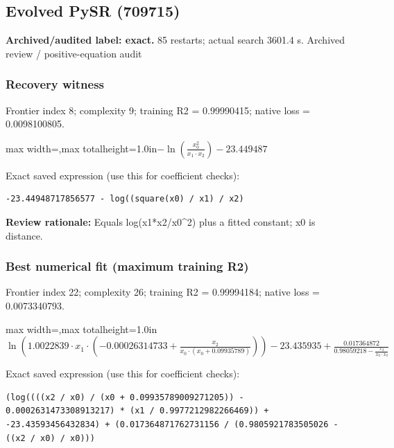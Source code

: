 \documentclass[10pt,letterpaper,landscape]{article}
\begin{document}
\begin{minipage}[t]{0.485\textwidth}
\subsection*{Evolved PySR (709715)}
\textbf{Archived/audited label: exact.} 85 restarts; actual search 3601.4 s.
{\small Archived review / positive-equation audit}
\subsubsection*{Recovery witness}
Frontier index 8; complexity 9; training R2 = 0.99990415; native loss = 0.0098100805.
\begin{center}\begin{adjustbox}{max width=\linewidth,max totalheight=1.0in}$\displaystyle - \ln{\left(\frac{x_{0}^{2}}{x_{1} \cdot x_{2}} \right)} - 23.449487$\end{adjustbox}\end{center}
{\scriptsize Exact saved expression (use this for coefficient checks):}
\begin{lstlisting}
-23.44948717856577 - log((square(x0) / x1) / x2)
\end{lstlisting}
{\small\textbf{Review rationale:} Equals log(x1*x2/x0\textasciicircum{}2) plus a fitted constant; x0 is distance.}
\subsubsection*{Best numerical fit (maximum training R2)}
Frontier index 22; complexity 26; training R2 = 0.99994184; native loss = 0.0073340793.
\begin{center}\begin{adjustbox}{max width=\linewidth,max totalheight=1.0in}$\displaystyle \ln{\left(1.0022839 \cdot x_{1} \cdot \left(-0.00026314733 + \frac{x_{2}}{x_{0} \cdot \left(x_{0} + 0.09935789\right)}\right) \right)} - 23.435935 + \frac{0.017364872}{0.98059218 - \frac{x_{2}}{x_{0} \cdot x_{0}}}$\end{adjustbox}\end{center}
{\scriptsize Exact saved expression (use this for coefficient checks):}
\begin{lstlisting}
(log((((x2 / x0) / (x0 + 0.09935789009271205)) - 0.0002631473308913217) * (x1 / 0.9977212982266469)) + -23.43593456432834) + (0.017364871762731156 / (0.9805921783505026 - ((x2 / x0) / x0)))
\end{lstlisting}
\end{minipage}
\clearpage{}\label{planck-10000}
\end{document}
